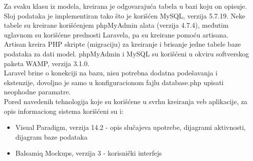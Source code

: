 \documentclass{article}
\begin{document}
Za svaku klasu iz modela, kreirana je odgovarajuća tabela u bazi koju on opisuje. Sloj podataka je implementiran tako što je korišćen MySQL, verzija 5.7.19. Neke tabele su kreirane korišćenjem phpMyAdmin alata (verzija 4.7.4), međutim uglavnom su korišćene prednosti Laravela, pa su kreirane pomoću artisana. Artisan kreira PHP skripte (migraciju) za kreiranje i brisanje jedne tabele baze podataka za dati model. phpMyAdmin i MySQL su korišćeni u okviru softverskog paketa WAMP, verzija 3.1.0.\\

Laravel brine o konekciji na bazu, nisu potrebna dodatna podešavanja i ekstenzije, dovoljno je samo u konfiguracionom fajlu database.php upisati neophodne paramatre. \\

Pored navedenih tehnologija koje su korišćene u svrhu kreiranja veb aplikacije, za opis informaciong sistema korišćeni su i:
\begin{itemize}
	\item Visual Paradigm, verzija 14.2 - opis slučajeva upotrebe, dijagrami aktivnosti, dijagram baze podataka
	\item Balsamiq Mockups, verzija 3 - korisnički interfejs
\end{itemize}
\end{document}
